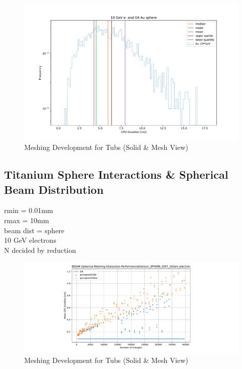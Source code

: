 \documentclass[12pt,a4paper]{article}
\begin{document}
\begin{figure}[h!]
\centering
\includegraphics[scale=0.4]{Images//Materials//Time_ex_dists.pdf}
\caption[width=\columnwidth]{Meshing Development for Tubs (Solid \& Mesh View)}
\label{tubspic}
\end{figure}

\newpage
\subsection{Titanium Sphere Interactions \& Spherical Beam Distribution}
rmin = 0.01mm\\
rmax = 10mm\\
beam dist = sphere\\
10 GeV electrons\\
N decided by reduction\\

\begin{figure}[h!]
\centering
\includegraphics[scale=0.5]{Images//BDSIM//numoftris_tit_10G_e_nostd.pdf}
\caption[width=\columnwidth]{Meshing Development for Tubs (Solid \& Mesh View)}
\label{tubspic}
\end{figure}
\end{document}
